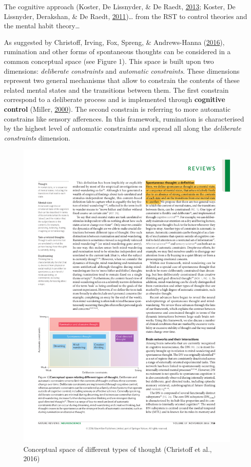 \documentclass[a4paper,12pt,twoside,openright,oldfontcommands]{memoir}
\begin{document}
The cognitive approach (Koster, De Lissnyder, \& De Raedt, \protect\hyperlink{ref-Koster2013}{2013}; Koster, De Lissnyder, Derakshan, \& De Raedt, \protect\hyperlink{ref-Koster2011}{2011})\ldots{} from the RST to control theories and the mental habit theory\ldots{}

As suggested by Christoff, Irving, Fox, Spreng, \& Andrews-Hanna (\protect\hyperlink{ref-christoff_mind-wandering_2016}{2016}), rumination and other forms of spontaneous thoughts can be considered in a common conceptual space (see Figure 1). This space is built upon two dimensions: \emph{deliberate constraints} and \emph{automatic constraints}. These dimensions represent two general mechanisms that allow to constrain the contents of these related mental states and the transitions between them. The first constrain correspond to a deliberate process and is implemented through \textbf{cognitive control} (Miller, \protect\hyperlink{ref-miller_prefontral_2000}{2000}). The second constrain is referring to more automatic constrains like sensory afferences. In this framework, rumination is characterised by the highest level of automatic constraints and spread all along the \emph{deliberate constraints} dimension.

\begin{figure}[H]

{\centering \includegraphics[width=0.75\linewidth]{assets/conceptual_space} 

}

\caption{Conceptual space of different types of thought (Christoff et al., 2016)}\label{fig:conceptual}
\end{figure}
\end{document}

